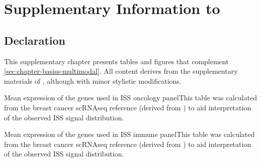 \chapter{Supplementary Information to \texorpdfstring{}{}}

\section*{Declaration}
This supplementary chapter presents tables and figures that complement \cref{sec:chapter-basiss-multimodal}. All content derives from the supplementary materials of \textcite{Lomakin2022-ks}, although with minor stylistic modifications.

    {Mean expression of the genes used in ISS oncology panel}{This table was calculated from the breast cancer \ac{scRNAseq} reference (derived from \textcite{Wu2021-uq}) to aid interpretation of the observed \ac{ISS} signal distribution.}

    {Mean expression of the genes used in \ac{ISS} immune panel}{This table was calculated from the breast cancer \ac{scRNAseq} reference (derived from \textcite{Wu2021-uq}) to aid interpretation of the observed \ac{ISS} signal distribution.}

